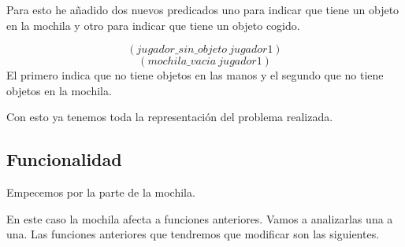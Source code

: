 \documentclass[]{article}
\begin{document}
Para esto he añadido dos nuevos predicados uno para indicar que tiene un objeto en la mochila y otro para indicar que tiene un objeto cogido.

$$
(jugador\_sin\_objeto\ jugador1)
$$
$$
(mochila\_vacia\ jugador1)
$$
El primero indica que no tiene objetos en las manos y el segundo que no tiene objetos en la mochila.

Con esto ya tenemos toda la representación del problema realizada. 

\subsection{Funcionalidad}
Empecemos por la parte de la mochila. 

En este caso la mochila afecta a funciones anteriores. Vamos a analizarlas una a una.
Las funciones anteriores que tendremos que modificar son las siguientes.
\end{document}
